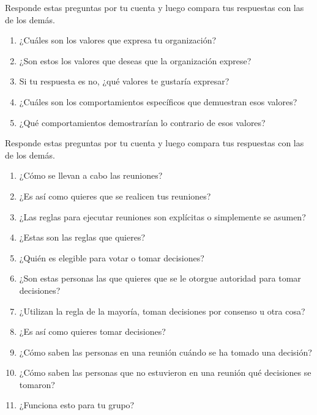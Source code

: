 
Responde estas preguntas por tu cuenta y
luego compara tus respuestas con las de los demás.

\begin{enumerate}

\item
  ¿Cuáles son los valores que expresa tu organización?

\item
  ¿Son estos los valores que deseas que la organización exprese?

\item
  Si tu respuesta es no, ¿qué valores te gustaría expresar?

\item
  ¿Cuáles son los comportamientos específicos que demuestran esos valores?

\item
  ¿Qué comportamientos demostrarían lo contrario de esos valores?
\end{enumerate}


Responde estas preguntas por tu cuenta y
luego compara tus respuestas con las de los demás.

\begin{enumerate}

\item
  ¿Cómo se llevan a cabo las reuniones?

\item
  ¿Es así como quieres que se realicen tus reuniones?

\item
  ¿Las reglas para ejecutar reuniones son explícitas o simplemente se asumen?

\item
  ¿Estas son las reglas que quieres?

\item
  ¿Quién es elegible para votar o tomar decisiones?

\item
  ¿Son estas personas las que quieres que se le otorgue autoridad para tomar decisiones?

\item
  ¿Utilizan la regla de la mayoría, toman decisiones por consenso u otra cosa?

\item
  ¿Es así como quieres tomar decisiones?

\item
  ¿Cómo saben las personas en una reunión cuándo se ha tomado una decisión?

\item
  ¿Cómo saben las personas que no estuvieron en una reunión qué decisiones se tomaron?

\item
  ¿Funciona esto para tu grupo?

\end{enumerate}

